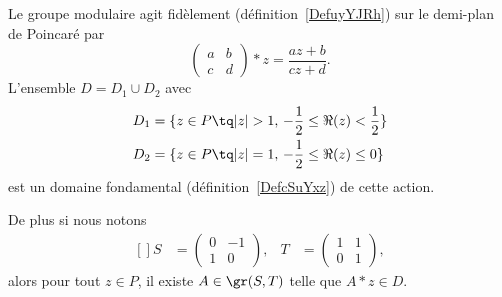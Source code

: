 \begin{theorem} \label{ThoItqXCm}
    Le groupe modulaire agit fidèlement (définition~\ref{DefuyYJRh}) sur le demi-plan de Poincaré par
    \begin{equation}    \label{EqVXvwlB}
        \begin{pmatrix}
            a    &   b    \\
            c    &   d
        \end{pmatrix}*z=\frac{ az+b }{ cz+d }.
    \end{equation}
    L'ensemble \(D= D_1\cup D_2\) avec
    \begin{subequations}
        \begin{align}
            D_1&=\{ z\in P\tq | z |>1,\,-\frac{ 1 }{2}\leq \Re(z)<\frac{ 1 }{2} \}\\
            D_2&=\{ z\in P\tq | z |=1,\,-\frac{ 1 }{2}\leq \Re(z)\leq0 \}
        \end{align}
    \end{subequations}
    est un domaine fondamental (définition~\ref{DefcSuYxz}) de cette action.

    De plus si nous notons
    \begin{equation}
        \begin{aligned}[]
            S&=\begin{pmatrix}
                0    &   -1    \\
                1    &   0
            \end{pmatrix},&T&=\begin{pmatrix}
                1    &   1    \\
                0    &   1
            \end{pmatrix},
        \end{aligned}
    \end{equation}
    alors pour tout \( z\in P\), il existe \( A\in \gr(S,T)\) telle que \( A*z\in D\).
\end{theorem}

